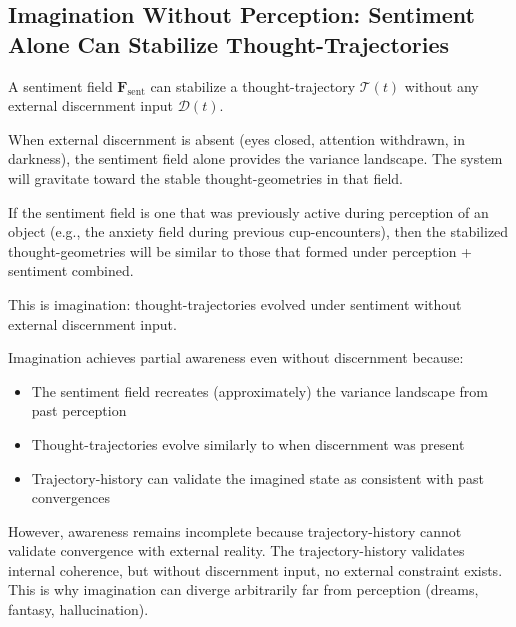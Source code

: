 \subsection{Imagination Without Perception: Sentiment Alone Can Stabilize Thought-Trajectories}

\begin{theorem}
\label{thm:imagination-mechanism}
A sentiment field $\mathbf{F}_{\text{sent}}$ can stabilize a thought-trajectory $\mathcal{T}(t)$ without any external discernment input $\mathcal{D}(t)$.

When external discernment is absent (eyes closed, attention withdrawn, in darkness), the sentiment field alone provides the variance landscape. The system will gravitate toward the stable thought-geometries in that field.

If the sentiment field is one that was previously active during perception of an object (e.g., the anxiety field during previous cup-encounters), then the stabilized thought-geometries will be similar to those that formed under perception + sentiment combined.

This is imagination: thought-trajectories evolved under sentiment without external discernment input.
\end{theorem}

\begin{corollary}
Imagination achieves partial awareness even without discernment because:
\begin{itemize}
\item The sentiment field recreates (approximately) the variance landscape from past perception
\item Thought-trajectories evolve similarly to when discernment was present
\item Trajectory-history can validate the imagined state as consistent with past convergences
\end{itemize}

However, awareness remains incomplete because trajectory-history cannot validate convergence with external reality. The trajectory-history validates internal coherence, but without discernment input, no external constraint exists. This is why imagination can diverge arbitrarily far from perception (dreams, fantasy, hallucination).
\end{corollary}



